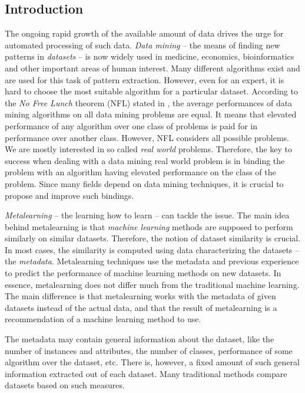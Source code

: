 \documentclass{article}
\begin{document}
\newpage
	
\begin{refsegment}
\section{Introduction}
The ongoing rapid growth of the available amount of data drives the urge for automated processing of such data.
\emph{Data mining} -- the means of finding new patterns in \emph{datasets} -- is now widely used in medicine, economics, bioinformatics and other important areas of human interest. Many different algorithms exist and are used for this task of pattern extraction. However, even for an expert, it is hard to choose the most suitable algorithm for a particular dataset. 
According to the \emph{No Free Lunch} theorem (NFL) stated in \cite{NoFreeLunchTheorem}, the average performances of data mining algorithms on all data mining problems are equal. It means that elevated performance of any algorithm over one class of problems is paid for in performance over another class. However, NFL considers all possible problems. We are mostly interested in so called \emph{real world} problems. Therefore, the key to success when dealing with a data mining real world problem is in binding the problem with an algorithm having elevated performance on the class of the problem. Since many fields depend on data mining techniques, it is crucial to propose and improve such bindings.

\emph{Metalearning} \cite{BrazdilMetalearning-2009} -- the learning how to learn -- can tackle the issue. 
The main idea behind metalearning is that \emph{machine learning} methods are supposed to perform similarly on similar datasets. Therefore, the notion of dataset similarity is crucial. In most cases, the similarity is computed using data characterizing the datasets -- the \emph{metadata}. Metalearning techniques use the metadata and previous experience to predict the performance of machine learning methods on new datasets. In essence, metalearning does not differ much from the traditional machine learning. The main difference is that metalearning works with the metadata of given datasets instead of the actual data, and that the result of metalearning is a recommendation of a machine learning method to use. 

The metadata may contain general information about the dataset, like the number of instances and attributes, the number of classes, performance of some algorithm over the dataset, etc. There is, however, a fixed amount of such general information extracted out of each dataset.  Many traditional methods compare datasets based on such measures.


\end{refsegment}
\end{document}
